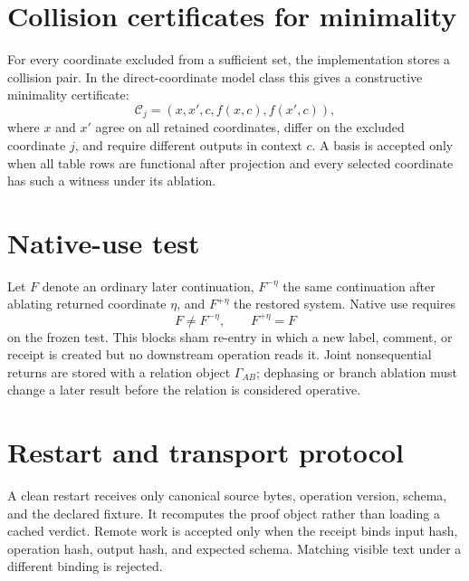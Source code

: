 \documentclass[11pt,a4paper]{article}
\begin{document}
\section{Collision certificates for minimality}
For every coordinate excluded from a sufficient set, the implementation stores a collision pair. In the direct-coordinate model class this gives a constructive minimality certificate:
\begin{equation}
\mathcal C_j=(x,x',c,f(x,c),f(x',c)),
\end{equation}
where $x$ and $x'$ agree on all retained coordinates, differ on the excluded coordinate $j$, and require different outputs in context $c$. A basis is accepted only when all table rows are functional after projection and every selected coordinate has such a witness under its ablation.

\section{Native-use test}
Let $F$ denote an ordinary later continuation, $F^{-\eta}$ the same continuation after ablating returned coordinate $\eta$, and $F^{+\eta}$ the restored system. Native use requires
\begin{equation}
F\ne F^{-\eta},\qquad F^{+\eta}=F
\end{equation}
on the frozen test. This blocks sham re-entry in which a new label, comment, or receipt is created but no downstream operation reads it. Joint nonsequential returns are stored with a relation object $\Gamma_{AB}$; dephasing or branch ablation must change a later result before the relation is considered operative.

\section{Restart and transport protocol}
A clean restart receives only canonical source bytes, operation version, schema, and the declared fixture. It recomputes the proof object rather than loading a cached verdict. Remote work is accepted only when the receipt binds input hash, operation hash, output hash, and expected schema. Matching visible text under a different binding is rejected.
\end{document}
